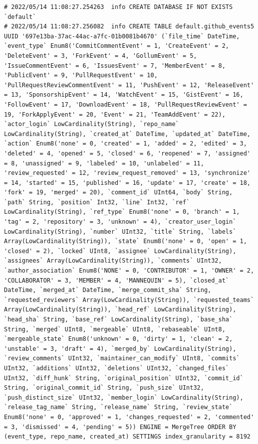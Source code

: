 \begin{verbatim}
# 2022/05/14 11:08:27.254263  info CREATE DATABASE IF NOT EXISTS `default`
# 2022/05/14 11:08:27.256082  info CREATE TABLE default.github_events5 UUID '697e13ba-37ac-44ac-a7fc-01b0081b4670' (`file_time` DateTime, `event_type` Enum8('CommitCommentEvent' = 1, 'CreateEvent' = 2, 'DeleteEvent' = 3, 'ForkEvent' = 4, 'GollumEvent' = 5, 'IssueCommentEvent' = 6, 'IssuesEvent' = 7, 'MemberEvent' = 8, 'PublicEvent' = 9, 'PullRequestEvent' = 10, 'PullRequestReviewCommentEvent' = 11, 'PushEvent' = 12, 'ReleaseEvent' = 13, 'SponsorshipEvent' = 14, 'WatchEvent' = 15, 'GistEvent' = 16, 'FollowEvent' = 17, 'DownloadEvent' = 18, 'PullRequestReviewEvent' = 19, 'ForkApplyEvent' = 20, 'Event' = 21, 'TeamAddEvent' = 22), `actor_login` LowCardinality(String), `repo_name` LowCardinality(String), `created_at` DateTime, `updated_at` DateTime, `action` Enum8('none' = 0, 'created' = 1, 'added' = 2, 'edited' = 3, 'deleted' = 4, 'opened' = 5, 'closed' = 6, 'reopened' = 7, 'assigned' = 8, 'unassigned' = 9, 'labeled' = 10, 'unlabeled' = 11, 'review_requested' = 12, 'review_request_removed' = 13, 'synchronize' = 14, 'started' = 15, 'published' = 16, 'update' = 17, 'create' = 18, 'fork' = 19, 'merged' = 20), `comment_id` UInt64, `body` String, `path` String, `position` Int32, `line` Int32, `ref` LowCardinality(String), `ref_type` Enum8('none' = 0, 'branch' = 1, 'tag' = 2, 'repository' = 3, 'unknown' = 4), `creator_user_login` LowCardinality(String), `number` UInt32, `title` String, `labels` Array(LowCardinality(String)), `state` Enum8('none' = 0, 'open' = 1, 'closed' = 2), `locked` UInt8, `assignee` LowCardinality(String), `assignees` Array(LowCardinality(String)), `comments` UInt32, `author_association` Enum8('NONE' = 0, 'CONTRIBUTOR' = 1, 'OWNER' = 2, 'COLLABORATOR' = 3, 'MEMBER' = 4, 'MANNEQUIN' = 5), `closed_at` DateTime, `merged_at` DateTime, `merge_commit_sha` String, `requested_reviewers` Array(LowCardinality(String)), `requested_teams` Array(LowCardinality(String)), `head_ref` LowCardinality(String), `head_sha` String, `base_ref` LowCardinality(String), `base_sha` String, `merged` UInt8, `mergeable` UInt8, `rebaseable` UInt8, `mergeable_state` Enum8('unknown' = 0, 'dirty' = 1, 'clean' = 2, 'unstable' = 3, 'draft' = 4), `merged_by` LowCardinality(String), `review_comments` UInt32, `maintainer_can_modify` UInt8, `commits` UInt32, `additions` UInt32, `deletions` UInt32, `changed_files` UInt32, `diff_hunk` String, `original_position` UInt32, `commit_id` String, `original_commit_id` String, `push_size` UInt32, `push_distinct_size` UInt32, `member_login` LowCardinality(String), `release_tag_name` String, `release_name` String, `review_state` Enum8('none' = 0, 'approved' = 1, 'changes_requested' = 2, 'commented' = 3, 'dismissed' = 4, 'pending' = 5)) ENGINE = MergeTree ORDER BY (event_type, repo_name, created_at) SETTINGS index_granularity = 8192

\end{verbatim}
